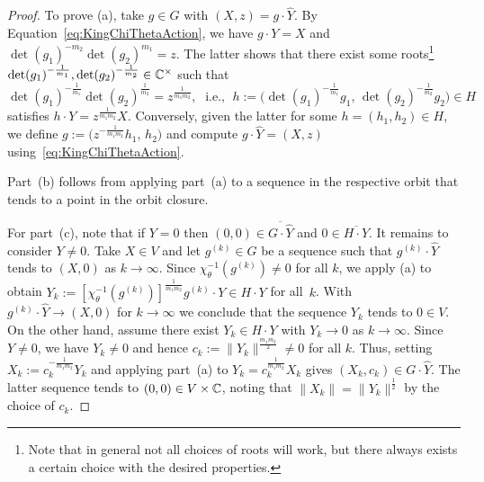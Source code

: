 \begin{proof}
	To prove (a), take $g \in G$ with $(X,z) = g \cdot \hat{Y}$. By Equation~\eqref{eq:KingChiThetaAction}, we have $g \cdot Y = X$ and $\det(g_1)^{-m_2} \det(g_2)^{m_1} = z$. The latter shows that there exist some roots\footnote{Note that in general not all choices of roots will work, but there always exists a certain choice with the desired properties.} $\det(g_1)^{-\frac{1}{m_1}}, \det(g_2)^{-\frac{1}{m_2}} \in \mathbb C^\times$ such that 
		\[ \det(g_1)^{-\frac{1}{m_1}} \det(g_2)^{\frac{1}{m_2}} = z^{\frac{1}{m_1 m_2}}, \; \text{ i.e., } \; h := \big( \det(g_1)^{-\frac{1}{m_1}} g_1, \, \det(g_2)^{-\frac{1}{m_2}} g_2 \big) \in H \]
	satisfies $h \cdot Y = z^{\frac{1}{m_1 m_2}} X$. 
	Conversely, given the latter for some $h = (h_1, h_2) \in H$, we define $g := \big( z^{-\frac{1}{m_1 m_2}} h_1, \, h_2 \big)$ and compute $g \cdot \hat{Y} = (X,z)$ using~\eqref{eq:KingChiThetaAction}.
	
	Part~(b) follows from applying part~(a) to a sequence in the respective orbit that tends to a point in the orbit closure.
	
	For part~(c), note that if $Y=0$ then $(0,0) \in \overline{G \cdot \hat{Y}}$ and $0 \in \overline{H \cdot Y}$. It remains to consider $Y \neq 0$. Take $X \in V$ and let $g^{(k)} \in G$ be a sequence such that $g^{(k)} \cdot \hat{Y}$ tends to $(X,0)$ as $k \to \infty$. 
	Since $\chi_{\theta}^{-1}(g^{(k)}) \neq 0$ for all $k$, we apply (a) to obtain $
	Y_k := \left[ \chi_{\theta}^{-1}(g^{(k)}) \right]^{\frac{1}{m_1 m_2}} g^{(k)} \cdot Y \in H \cdot Y $
	for all~$k$. With $g^{(k)} \cdot \hat{Y} \to (X,0)$ for $k \to \infty$ we conclude that the sequence $Y_k$ tends to $0 \in V$. On the other hand, assume there exist $Y_k \in H \cdot Y$ with $Y_k \to 0$ as $k \to \infty$. Since $Y \neq 0$, we have $Y_k \neq 0$ and hence $c_k := \| Y_k \|^{\frac{m_1 m_2}{2}} \neq 0$ for all $k$. Thus, setting 
	$X_k := c_k^{-\frac{1}{m_1 m_2}} Y_k$
	and applying part~(a) to $Y_k = c_k^{\frac{1}{m_1m_2}} X_k$ gives $(X_k, c_k) \in G \cdot \hat{Y}$. The latter sequence tends to $(0,0) \in V \times \mathbb C$, noting that $\|X_k\| = \|Y_k\|^{\frac{1}{2}}$ by the choice of $c_k$.
	

\end{proof}
